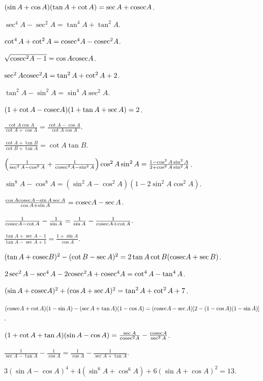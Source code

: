\item $(\sin A + \cos A)(\tan A + \cot A) = \sec A + {\rm cosec} A$.
\item $\sec^4A - \sec^2A = \tan^4A + \tan^2A$.
\item $\cot^4A + \cot^2A = {\rm cosec}^4A - {\rm cosec}^2A$.
\item $\sqrt{{\rm cosec}^2A - 1} = \cos A{\rm cosec} A$.
\item $\sec^2A{\rm cosec}^2A = \tan^2A + \cot^2A + 2$.
\item $\tan^2A - \sin^2A = \sin^4A \sec^2A$.
\item $(1 + \cot A - {\rm cosec} A)(1 + \tan A + \sec A) = 2$.
\item $\frac{\cot A\cos A}{\cot A + \cos A} = \frac{\cot A - \cos A}{\cot A \cos A}$.
\item $\frac{\cot A + \tan B}{\cot B + \tan A} = \cot A \tan B$.
\item $\left(\frac{1}{\sec^2 A - \cos^2A} + \frac{1}{{\rm cosec}^2A - \sin^2A}\right)\cos^2A\sin^2A = \frac{1 - \cos^2A\sin^2A}{2 +
    \cos^2A\sin^2A}$.
\item $\sin^8A - \cos^8A = (\sin^2A - \cos^2A)(1 - 2\sin^2A\cos^2A)$.
\item $\frac{\cos A{\rm cosec} A - \sin A\sec A}{\cos A + \sin A} = {\rm cosec} A - \sec A$.
\item $\frac{1}{{\rm cosec} A - \cot A} - \frac{1}{\sin A} = \frac{1}{\sin A} - \frac{1}{{\rm cosec} A + \cot A}$.
\item $\frac{\tan A + \sec A - 1}{\tan A - \sec A + 1} = \frac{1 + \sin A}{\cos A}$.
\item $(\tan A + {\rm cosec} B)^2 - (\cot B - \sec A)^2 = 2\tan A\cot B({\rm cosec} A + \sec B)$.
\item $2\sec^2 A - \sec^4A - 2{\rm cosec}^2A + {\rm cosec}^4A = \cot^4A - \tan^4A$.
\item $(\sin A + {\rm cosec} A)^2 + (\cos A + \sec A)^2 = \tan^2A + \cot^2A + 7$.
\item $({\rm cosec} A + \cot A)(1 - \sin A) - (\sec A + \tan A)(1 - \cos A) = ({\rm cosec} A - \sec A)[2 - (1 - \cos A)(1 - \sin A)]$.
\item $(1 + \cot A + \tan A)(\sin A - \cos A) = \frac{\sec A}{{\rm cosec}^2A} - \frac{{\rm cosec} A}{\sec^2A}$.
\item $\frac{1}{\sec A - \tan A} - \frac{1}{\cos A} = \frac{1}{\cos A} - \frac{1}{\sec A + \tan A}$.
\item $3(\sin A - \cos A)^4 + 4(\sin^6 A + \cos^6 A) + 6(\sin A + \cos A)^2 = 13$.
